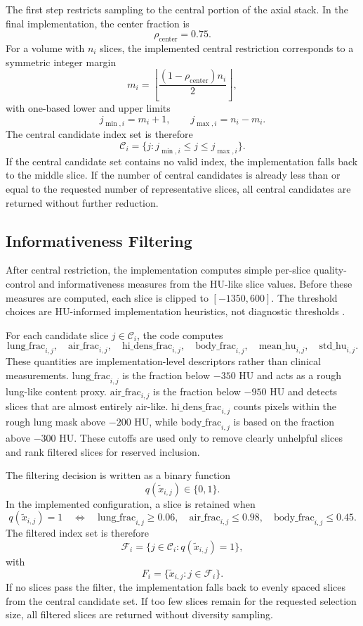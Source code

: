 The first step restricts sampling to the central portion of the axial stack. In the final implementation, the center fraction is
\[
\rho_{\mathrm{center}} = 0.75.
\]
For a volume with \(n_i\) slices, the implemented central restriction corresponds to a symmetric integer margin
\[
m_i =
\left\lfloor
\frac{(1-\rho_{\mathrm{center}})n_i}{2}
\right\rfloor,
\]
with one-based lower and upper limits
\[
j_{\min,i} = m_i + 1,
\qquad
j_{\max,i} = n_i - m_i.
\]
The central candidate index set is therefore
\[
\mathcal{C}_i =
\{j : j_{\min,i} \leq j \leq j_{\max,i}\}.
\]
If the central candidate set contains no valid index, the implementation falls back to the middle slice. If the number of central candidates is already less than or equal to the requested number of representative slices, all central candidates are returned without further reduction.


\subsection{Informativeness Filtering}
\label{sec:informativeness_filtering}

After central restriction, the implementation computes simple per-slice quality-control and informativeness measures from the HU-like slice values. Before these measures are computed, each slice is clipped to \([-1350,600]\). The threshold choices are HU-informed implementation heuristics, not diagnostic thresholds \cite{whiting2015ctbasic,dejong2005ctairways}.

For each candidate slice \(j \in \mathcal{C}_i\), the code computes
\[
\mathrm{lung\_frac}_{i,j},\quad
\mathrm{air\_frac}_{i,j},\quad
\mathrm{hi\_dens\_frac}_{i,j},\quad
\mathrm{body\_frac}_{i,j},\quad
\mathrm{mean\_hu}_{i,j},\quad
\mathrm{std\_hu}_{i,j}.
\]
These quantities are implementation-level descriptors rather than clinical measurements. \(\mathrm{lung\_frac}_{i,j}\) is the fraction below \(-350\) HU and acts as a rough lung-like content proxy. \(\mathrm{air\_frac}_{i,j}\) is the fraction below \(-950\) HU and detects slices that are almost entirely air-like. \(\mathrm{hi\_dens\_frac}_{i,j}\) counts pixels within the rough lung mask above \(-200\) HU, while \(\mathrm{body\_frac}_{i,j}\) is based on the fraction above \(-300\) HU. These cutoffs are used only to remove clearly unhelpful slices and rank filtered slices for reserved inclusion.

The filtering decision is written as a binary function
\[
q(\tilde{x}_{i,j}) \in \{0,1\}.
\]
In the implemented configuration, a slice is retained when
\[
q(\tilde{x}_{i,j}) = 1
\quad \Longleftrightarrow \quad
\mathrm{lung\_frac}_{i,j} \geq 0.06,\quad
\mathrm{air\_frac}_{i,j} \leq 0.98,\quad
\mathrm{body\_frac}_{i,j} \leq 0.45.
\]
The filtered index set is therefore
\[
\mathcal{F}_i =
\{j \in \mathcal{C}_i : q(\tilde{x}_{i,j}) = 1\},
\]
with
\[
F_i =
\{\tilde{x}_{i,j}: j \in \mathcal{F}_i\}.
\]
If no slices pass the filter, the implementation falls back to evenly spaced slices from the central candidate set. If too few slices remain for the requested selection size, all filtered slices are returned without diversity sampling.


